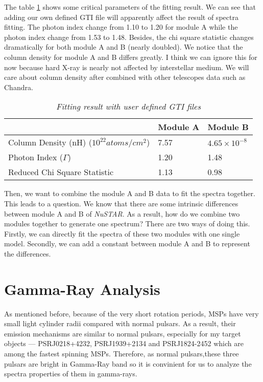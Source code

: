 \documentclass[12pt]{report}
\newcommand{\mycaption}[1]{\caption{\textit{\footnotesize #1}}}
\begin{document}
          \indent The table \ref{table:spectra_usrgti} shows some critical parameters of the fitting result. 
          We can see that adding our own defined GTI file will apparently affect the result of spectra fitting. 
          The photon index change from 1.10 to 1.20 for module A while the photon index change from 1.53 to 
          1.48. Besides, the chi square statistic changes dramatically for both module A and B (nearly doubled).
          We notice that the column density for module A and B differs greatly. 
          I think we can ignore this for now because hard X-ray is nearly not affected by
          interstellar medium. We will care about column density after combined with other telescopes data such 
          as Chandra. 
          \begin{table}[!h]   
            \centering
            \begin{tabular}{| m{4cm} | m{3cm} | m{3cm} |}
              \hline
              & Module A & Module B \\
              \hline
              Column Density (nH) ($10^{22} atoms/cm^2$) & 7.57 & $4.65\times10^{-8}$\\ 
              \hline
              Photon Index ($\Gamma$) & 1.20 & 1.48 \\
              \hline 
              Reduced Chi Square Statistic & 1.13 & 0.98 \\
              \hline 
            \end{tabular}
            \mycaption{Fitting result with user defined GTI files}
            \label{table:spectra_usrgti}
          \end{table}

          Then, we want to combine the module A and B data to fit the spectra together. This leads to a question.
          We know that there are some intrinsic differences between module A and B of \textit{NuSTAR}. As a result,
          how do we combine two modules together to generate one spectrum? There are two ways of doing this. Firstly,
          we can directly fit the spectra of these two modules with one single model. Secondly, we can add a 
          constant between module A and B to represent the differences. %

 
  

  \chapter{Gamma-Ray Analysis}
      As mentioned before, because of the very short rotation periods, MSPs have very small light cylinder radii 
      compared with normal pulsars. As a result, their emission mechanisms are similar to normal pulsars, 
      especially for my target objects --- PSRJ0218+4232, PSRJ1939+2134 and PSRJ1824-2452
      which are among the fastest spinning MSPs. Therefore, as normal pulsars,these three 
      pulsars are bright in Gamma-Ray band so it is convinient for us to analyze the spectra 
      properties of them in gamma-rays.
\end{document}
